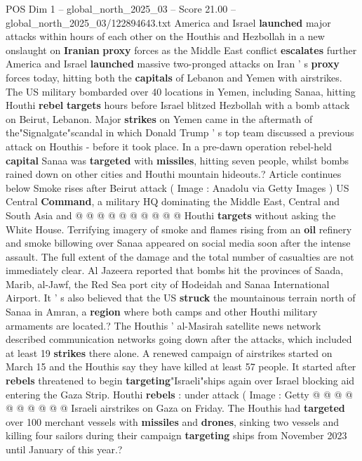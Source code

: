\begin{textsample}{POS Dim 1 – global\_north\_2025\_03 – Score 21.00 – global\_north\_2025\_03/122894643.txt}  \label{ex:f1_pos_422}
America and Israel \textbf{launched} major attacks within hours of each other on the Houthis and Hezbollah in a new onslaught on \textbf{Iranian} \textbf{proxy} forces as the Middle East conflict \textbf{escalates} further America and Israel \textbf{launched} massive two-pronged attacks on Iran ' s \textbf{proxy} forces today, hitting both the \textbf{capitals} of Lebanon and Yemen with airstrikes.
The US military bombarded over 40 locations in Yemen, including Sanaa, hitting Houthi \textbf{rebel} \textbf{targets} hours before Israel blitzed Hezbollah with a bomb attack on Beirut, Lebanon.
Major \textbf{strikes} on Yemen came in the aftermath of the"Signalgate"scandal in which Donald Trump ' s top team discussed a previous attack on Houthis - before it took place.
In a pre-dawn operation rebel-held \textbf{capital} Sanaa was \textbf{targeted} with \textbf{missiles}, hitting seven people, whilst bombs rained down on other cities and Houthi mountain hideouts.?
Article continues below Smoke rises after Beirut attack ( Image : Anadolu via Getty Images ) US Central \textbf{Command}, a military HQ dominating the Middle East, Central and South Asia and @ @ @ @ @ @ @ @ @ @ Houthi \textbf{targets} without asking the White House.
Terrifying imagery of smoke and flames rising from an \textbf{oil} refinery and smoke billowing over Sanaa appeared on social media soon after the intense assault.
The full extent of the damage and the total number of casualties are not immediately clear.
Al Jazeera reported that bombs hit the provinces of Saada, Marib, al-Jawf, the Red Sea port city of Hodeidah and Sanaa International Airport.
It ' s also believed that the US \textbf{struck} the mountainous terrain north of Sanaa in Amran, a \textbf{region} where both camps and other Houthi military armaments are located.?
The Houthis ' al-Masirah satellite news network described communication networks going down after the attacks, which included at least 19 \textbf{strikes} there alone.
A renewed campaign of airstrikes started on March 15 and the Houthis say they have killed at least 57 people.
It started after \textbf{rebels} threatened to begin \textbf{targeting}"Israeli"ships again over Israel blocking aid entering the Gaza Strip.
Houthi \textbf{rebels} : under attack ( Image : Getty @ @ @ @ @ @ @ @ @ @ Israeli airstrikes on Gaza on Friday.
The Houthis had \textbf{targeted} over 100 merchant vessels with \textbf{missiles} and \textbf{drones}, sinking two vessels and killing four sailors during their campaign \textbf{targeting} ships from November 2023 until January of this year.?

\end{textsample}
